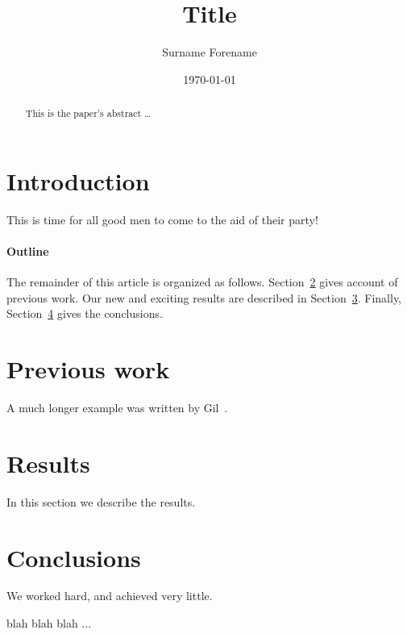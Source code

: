 \documentclass[12pt]{article}
\title{Title}
\author{Surname Forename}
\date{\today}
\begin{document}
\maketitle
\thispagestyle{empty} %



\begin{abstract}
This is the paper's abstract \ldots
\end{abstract}

\section{Introduction}
This is time for all good men to come to the aid of their party!

\paragraph{Outline}
The remainder of this article is organized as follows.
Section~\ref{previous work} gives account of previous work.
Our new and exciting results are described in Section~\ref{results}.
Finally, Section~\ref{conclusions} gives the conclusions.

\section{Previous work}\label{previous work}
A much longer \LaTeXe{} example was written by Gil~\cite{Gil:02}.

\section{Results}\label{results}
In this section we describe the results.

\section{Conclusions}\label{conclusions}
We worked hard, and achieved very little.






blah blah blah ...
\end{document}
